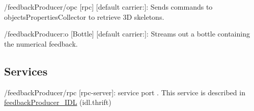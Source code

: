 \begin{DoxyItemize}
\item /feedback\+Producer/opc \mbox{[}rpc\mbox{]} \mbox{[}default carrier\+:\mbox{]}\+: Sends commands to objects\+Properties\+Collector to retrieve 3D skeletons.
\item /feedback\+Producer\+:o \mbox{[}Bottle\mbox{]} \mbox{[}default carrier\+:\mbox{]}\+: Streams out a bottle containing the numerical feedback.
\end{DoxyItemize}\hypertarget{group__skeletonViewer_services_sec}{}\subsection{Services}\label{group__skeletonViewer_services_sec}

\begin{DoxyItemize}
\item /feedback\+Producer/rpc \mbox{[}rpc-\/server\mbox{]}\+: service port . This service is described in \hyperlink{classfeedbackProducer__IDL}{feedback\+Producer\+\_\+\+I\+DL} (idl.\+thrift) 
\end{DoxyItemize}